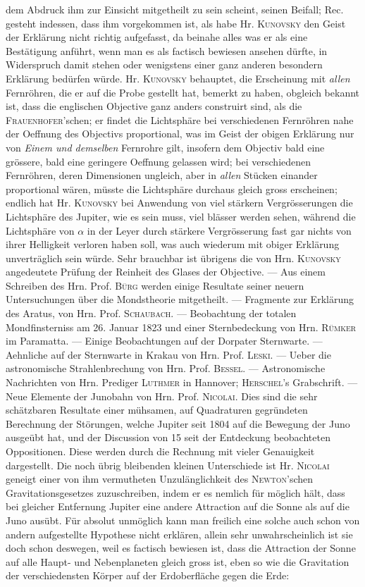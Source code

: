 dem Abdruck ihm zur Einsicht mitgetheilt zu sein scheint, seinen Beifall; Rec. gesteht indessen, dass ihm vorgekommen ist, als habe Hr. \textsc{Kunovsky} den Geist der Erklärung nicht richtig aufgefasst, da beinahe alles was er als eine Bestätigung anführt, wenn man es als factisch bewiesen ansehen dürfte, in Widerspruch damit stehen oder wenigstens einer ganz anderen besondern Erklärung bedürfen würde. Hr. \textsc{Kunovsky} behauptet, die Erscheinung mit \emph{allen} Fernröhren, die er auf die Probe gestellt hat, bemerkt zu haben, obgleich bekannt ist, dass die englischen Objective ganz anders construirt sind, als die \textsc{Frauenhofer}'schen; er findet die Lichtsphäre bei verschiedenen Fernröhren nahe der Oeffnung des Objectivs proportional, was im Geist der obigen Erklärung nur von \emph{Einem und demselben} Fernrohre gilt, insofern dem Objectiv bald eine grössere, bald eine geringere Oeffnung gelassen wird; bei verschiedenen Fernröhren, deren Dimensionen ungleich, aber in \emph{allen} Stücken einander proportional wären, müsste die Lichtsphäre durchaus gleich gross erscheinen; endlich hat Hr. \textsc{Kunovsky} bei Anwendung von viel stärkern Vergrösserungen die Lichtsphäre des Jupiter, wie es sein muss, viel blässer werden sehen, während die Lichtsphäre von $\alpha$ in der Leyer durch stärkere Vergrösserung fast gar nichts von ihrer Helligkeit verloren haben soll, was auch wiederum mit obiger Erklärung unverträglich sein würde. Sehr brauchbar ist übrigens die von Hrn. \textsc{Kunovsky} angedeutete Prüfung der Reinheit des Glases der Objective. --- Aus einem Schreiben des Hrn. Prof. \textsc{Bürg} werden einige Resultate seiner neuern Untersuchungen über die Mondstheorie mitgetheilt. --- Fragmente zur Erklärung des Aratus, von Hrn. Prof. \textsc{Schaubach}. --- Beobachtung der totalen Mondfinsterniss am 26. Januar 1823 und einer Sternbedeckung von Hrn. \textsc{Rümker} im Paramatta. --- Einige Beobachtungen auf der Dorpater Sternwarte. --- Aehnliche auf der Sternwarte in Krakau von Hrn. Prof. \textsc{Leski}. --- Ueber die astronomische Strahlenbrechung von Hrn. Prof. \textsc{Bessel}. --- Astronomische Nachrichten von Hrn. Prediger \textsc{Luthmer} in Hannover; \textsc{Herschel}'s Grabschrift. --- Neue Elemente der Junobahn von Hrn. Prof. \textsc{Nicolai}. Dies sind die sehr schätzbaren Resultate einer mühsamen, auf Quadraturen gegründeten Berechnung der Störungen, welche Jupiter seit 1804 auf die Bewegung der Juno ausgeübt hat, und der Discussion von 15 seit der Entdeckung beobachteten Oppositionen. Diese werden durch die Rechnung mit vieler Genauigkeit dargestellt. Die noch übrig bleibenden kleinen Unterschiede ist Hr. \textsc{Nicolai} geneigt einer von ihm vermutheten Unzulänglichkeit des \textsc{Newton}'schen Gravitationsgesetzes zuzuschreiben, indem er es nemlich für möglich hält, dass bei gleicher Entfernung Jupiter eine andere Attraction auf die Sonne als auf die Juno ausübt. Für absolut unmöglich kann man freilich eine solche auch schon von andern aufgestellte Hypothese nicht erklären, allein sehr unwahrscheinlich ist sie doch schon deswegen, weil es factisch bewiesen ist, dass die Attraction der Sonne auf alle Haupt- und Nebenplaneten  gleich gross ist, eben so wie die Gravitation der verschiedensten Körper auf der Erdoberfläche gegen die Erde: 
